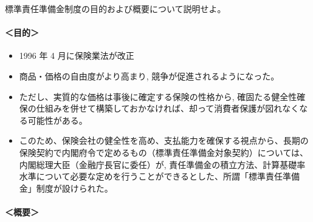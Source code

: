 \documentclass[report,gutter=10mm,fore-edge=10mm,uplatex,dvipdfmx]{jlreq}
\begin{document}

標準責任準備金制度の目的および概要について説明せよ。


\paragraph{＜目的＞}

\begin{itemize}
\item
  1996 年 4 月に保険業法が改正
\item
  商品・価格の自由度がより高まり, 競争が促進されるようになった。
\item
  ただし、実質的な価格は事後に確定する保険の性格から,
  確固たる健全性確保の仕組みを併せて構築しておかなければ、却って消費者保護が図れなくなる可能性がある。
\item
  このため、保険会社の健全性を高め、支払能力を確保する視点から、長期の保険契約で内閣府令で定めるもの（標準責任準備金対象契約）については、
  内閣総理大臣（金融庁長官に委任）が,
  責任準備金の積立方法、計算基礎率水準について必要な定めを行うことができるとした、所謂「標準責任準備金」制度が設けられた。
\end{itemize}

\paragraph{＜概要＞}
\end{document}

